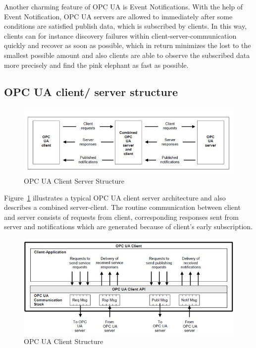 \documentclass[]{llncs}
\begin{document}
Another charming feature of OPC UA is Event Notifications. With the help of Event Notification, OPC UA servers are allowed to immediately after some conditions are satisfied publish data, which is subscribed by clients. In this way, clients can for instance discovery failures within client-server-communication quickly and recover as soon as possible, which in return minimizes the lost to the smallest possible amount and also clients are able to observe the subscribed data more precisely and find the pink elephant as fast as possible.

\subsection{OPC UA client/ server structure}
\begin{figure}
	\centering
	\includegraphics[width=1.00\textwidth]{cs.jpg}
		\caption[ ]{OPC UA Client Server Structure\cite{O1}}
	\label{fig:cs}
\end{figure}
Figure~\ref{fig:cs} illustrates a typical OPC UA client server architecture and also describes a combined server-client. The routine communication between client and server consists of requests from client, corresponding responses sent from server and notifications which are generated because of client’s early subscription.

\begin{figure}
	\centering
	\includegraphics[width=1.1\textwidth]{client.jpg}
		\caption[ ]{OPC UA Client Structure\cite{O1}}
	\label{fig:client}
\end{figure}
\end{document}
